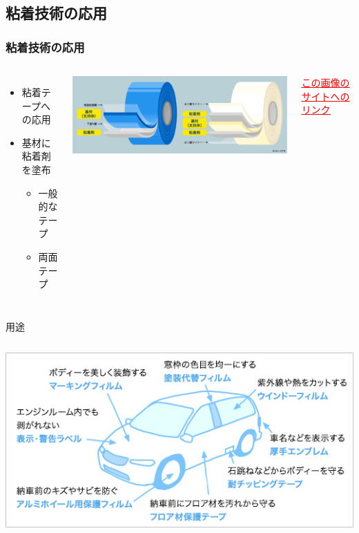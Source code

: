 \documentclass[unicode,12pt]{beamer}%
\begin{document}
\subsection{粘着技術の応用}
\begin{frame}
	\frametitle{粘着技術の応用}
			\begin{columns}[onlytextwidth]
					\begin{itemize}
						\item 粘着テープへの応用
						\item 基材に粘着剤を塗布
						\begin{itemize}
							\item 一般的なテープ
							\item 両面テープ
						\end{itemize}
					\end{itemize}
				\vspace{2mm}
				\centering
				\includegraphics[width=.8\textwidth]{nentyaku_tape.jpg}

				\vspace{-3mm}
				\href{https://tape-omakase-navi.com/column/post-14/}{\textcolor{red}{\underline{\scriptsize{この画像のサイトへのリンク}}}}
			\end{columns}
		\begin{block}{用途}
			\begin{columns}[c, onlytextwidth]
				\centering
				\includegraphics[width=\textwidth]{car_psa.jpg}


\end{columns}
\end{block}
\end{frame}
\end{document}
